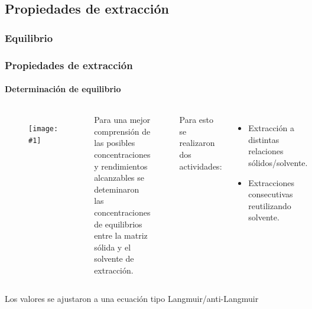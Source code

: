 \documentclass[aspectratio=1610]{beamer}
\newcommand{\fig}[3]{
\begin{columns}
\column{0.4\textwidth}
\begin{figure}[htp] \texttt{[image: \#1]}\caption{#2}\end{figure}
\column{0.6\textwidth}#3
\end{columns}
}
\newcommand{\ssec}{Título de subsección}
\begin{document}
\renewcommand{\ssec}{Propiedades de extracción}
\subsection{\ssec}
\subsubsection{Equilibrio}
\begin{frame}[c]
	\frametitle{\ssec}
	\framesubtitle{Determinación de equilibrio}
	\fig{./figs/equilibrio.png}{}{
	Para una mejor comprensión de las posibles concentraciones y rendimientos
	alcanzables se deteminaron las concentraciones de equilibrios entre la matriz
	sólida y el solvente de extracción.

	~

	Para esto se realizaron dos actividades:

	\begin{itemize}
		\item Extracción a distintas relaciones sólidos/solvente.
		\item Extracciones consecutivas reutilizando solvente.
	\end{itemize}
	}
	Los valores se ajustaron a una ecuación tipo Langmuir/anti-Langmuir
\end{frame}
\end{document}
